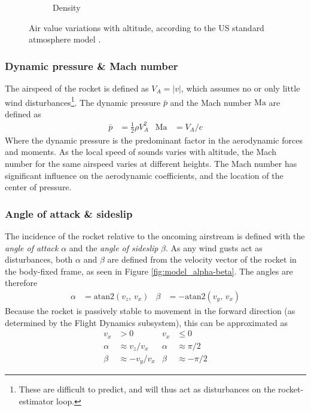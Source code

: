 \begin{figure}[ht]
\begin{subfigure}{0.32\textwidth}
        \caption{Density}
        \label{fig:atmos-density}
    \end{subfigure}
    \caption[US standard atmosphere model]{Air value  variations with altitude, according to the US standard atmosphere model \cite{stengel2004}.}
    \label{fig:atmosphere}
\end{figure}

\subsubsection{Dynamic pressure \& Mach number}
The airspeed of the rocket is defined as $V_A = |v|$, which assumes no or only little wind disturbances\footnote{These are difficult to predict, and will thus act as disturbances on the rocket-estimator loop.}.
The dynamic pressure $\bar p$ and the Mach number $\mathrm{Ma}$ are defined as
\begin{align}
    \bar p &= \frac{1}{2} \rho V_A^2 
    &
    \mathrm{Ma} &= V_A / c
\end{align}
Where the dynamic pressure is the predominant factor in the aerodynamic forces and moments.
As the local speed of sounds varies with altitude, the Mach number for the same airspeed varies at different heights.
The Mach number has significant influence on the aerodynamic coefficients, and the location of the center of pressure.


\subsubsection{Angle of attack \& sideslip}
The incidence of the rocket relative to the oncoming airstream is defined with the \textit{angle of attack} $\alpha$ and the \textit{angle of sideslip} $\beta$.
As any wind gusts act as disturbances, both $\alpha$ and $\beta$ are defined from the velocity vector of the rocket in the body-fixed frame, as seen in Figure \ref{fig:model_alpha-beta}.
The angles are therefore
\begin{align}
        \alpha &= \mathrm{atan2}(v_z, \, v_x) &  \beta &= - \mathrm{atan2}(v_y, \,v_x)
\end{align}
Because the rocket is passively stable to movement in the forward direction (as determined by the Flight Dynamics subsystem), this can be approximated as
\begin{align}
    v_x &> 0 & v_x &\leq 0 \nonumber \\
    \alpha &\approx v_z/v_x  & \alpha &\approx \pi/2 \\
    \beta &\approx - v_y/v_x & \beta &\approx - \pi/2
\end{align}

